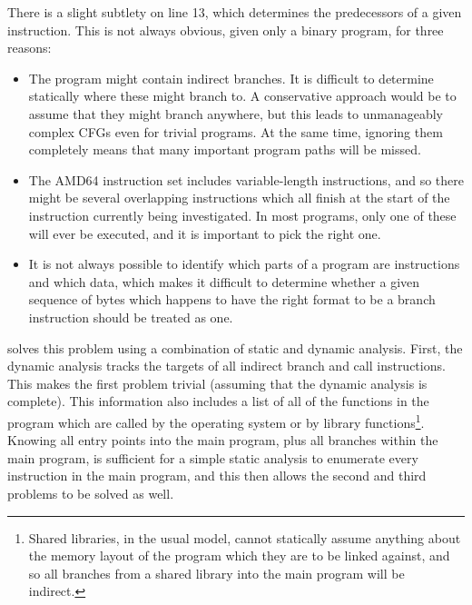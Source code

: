 There is a slight subtlety on line 13, which determines the
predecessors of a given instruction.  This is not always obvious,
given only a binary program, for three reasons:

\begin{itemize}
\item
  The program might contain indirect branches.  It is difficult to
  determine statically where these might branch to.  A conservative
  approach would be to assume that they might branch anywhere, but
  this leads to unmanageably complex CFGs even for trivial programs.
  At the same time, ignoring them completely means that many important
  program paths will be missed.
\item
  The AMD64 instruction set includes variable-length
  instructions, and so there might be several overlapping instructions
  which all finish at the start of the instruction currently being
  investigated.  In most programs, only one of these will ever be
  executed, and it is important to pick the right one.
\item
  It is not always possible to identify which parts of a program are
  instructions and which data, which makes it difficult to determine
  whether a given sequence of bytes which happens to have the right
  format to be a branch instruction should be treated as one.
\end{itemize}

{\Implementation} solves this problem using a combination of static
and dynamic analysis.  First, the dynamic analysis tracks the targets
of all indirect branch and call instructions.  This makes the first
problem trivial (assuming that the dynamic analysis is complete).
This information also includes a list of all of the functions in the
program which are called by the operating system or by library
functions\footnote{Shared libraries, in the usual model, cannot
  statically assume anything about the memory layout of the program
  which they are to be linked against, and so all branches from a
  shared library into the main program will be indirect.}.  Knowing
all entry points into the main program, plus all branches within the
main program, is sufficient for a simple static analysis to enumerate
every instruction in the main program, and this then allows the second
and third problems to be solved as well.



